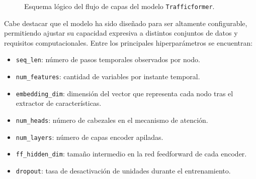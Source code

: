 \begin{figure}[H]
	\centering
	\caption{Esquema lógico del flujo de capas del modelo \texttt{Trafficformer}.}
	\label{fig:trafficformer_vertical}
\end{figure}

Cabe destacar que el modelo ha sido diseñado para ser altamente configurable, permitiendo ajustar su capacidad expresiva a distintos conjuntos de datos y requisitos computacionales. Entre los principales hiperparámetros se encuentran:

\begin{itemize}
	\item \texttt{seq\_len}: número de pasos temporales observados por nodo.
	\item \texttt{num\_features}: cantidad de variables por instante temporal.
	\item \texttt{embedding\_dim}: dimensión del vector que representa cada nodo tras el extractor de características.
	\item \texttt{num\_heads}: número de cabezales en el mecanismo de atención.
	\item \texttt{num\_layers}: número de capas encoder apiladas.
	\item \texttt{ff\_hidden\_dim}: tamaño intermedio en la red feedforward de cada encoder.
	\item \texttt{dropout}: tasa de desactivación de unidades durante el entrenamiento.
\end{itemize}

